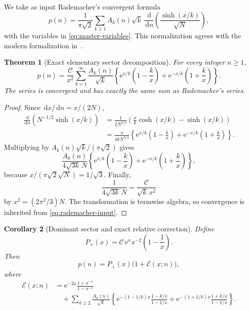 \documentclass[11pt,a4paper]{article}
\numberwithin{equation}{section}
\newtheorem{theorem}{Theorem}[section]
\newtheorem{corollary}[theorem]{Corollary}
\theoremstyle{remark}
\newcommand{\e}{\mathrm e}
\newcommand{\dd}{\,\mathrm d}
\newcommand{\Ccal}{\mathcal C}
\newcommand{\Ecal}{\mathcal E}
\begin{document}
We take as input Rademacher's convergent formula
\begin{equation}\label{eq:rademacher-input}
 p(n)=\frac1{\pi\sqrt2}\sum_{k\ge1}A_k(n)\sqrt{k}\,
 \frac{\dd}{\dd n}
 \left(\frac{\sinh(x/k)}{\sqrt N}\right),
\end{equation}
with the variables in \cref{eq:master-variables}.  This normalization agrees with the modern formalization in~\cite{EberlPaulson2026}.

\begin{theorem}[Exact elementary sector decomposition]\label{thm:exact-sector}
For every integer $n\ge1$,
\begin{equation}\label{eq:exact-sector}
 p(n)=\frac{\Ccal}{x^2}\sum_{k=1}^{\infty}\frac{A_k(n)}{\sqrt{k}}
 \left\{
 \e^{x/k}\left(1-\frac{k}{x}\right)
 +\e^{-x/k}\left(1+\frac{k}{x}\right)
 \right\}.
\end{equation}
The series is convergent and has exactly the same sum as Rademacher's series.
\end{theorem}

\begin{proof}
Since $\dd x/\dd n=x/(2N)$,
\begin{align}
 \frac{\dd}{\dd n}\left(N^{-1/2}\sinh(x/k)\right)
 &=\frac1{2N^{3/2}}
 \left(\frac{x}{k}\cosh(x/k)-\sinh(x/k)\right)\\
 &=\frac{x}{4kN^{3/2}}
 \left\{
 \e^{x/k}\left(1-\frac{k}{x}\right)
 +\e^{-x/k}\left(1+\frac{k}{x}\right)
 \right\}.
\end{align}
Multiplying by $A_k(n)\sqrt{k}/(\pi\sqrt2)$ gives
\[
 \frac{A_k(n)}{4\sqrt{3k}\,N}
 \left\{
 \e^{x/k}\left(1-\frac{k}{x}\right)
 +\e^{-x/k}\left(1+\frac{k}{x}\right)
 \right\},
\]
because $x/(\pi\sqrt2\sqrt N)=1/\sqrt3$.  Finally,
\[
 \frac1{4\sqrt{3k}\,N}=\frac{\Ccal}{\sqrt{k}\,x^2}
\]
by $x^2=(2\pi^2/3)N$.  The transformation is termwise algebra, so convergence is inherited from \cref{eq:rademacher-input}.
\end{proof}

\begin{corollary}[Dominant sector and exact relative correction]\label{cor:relative-correction}
Define
\begin{equation}\label{eq:Pplus}
 P_+(x)=\Ccal\,\e^x x^{-2}\left(1-\frac1x\right).
\end{equation}
Then
\begin{equation}\label{eq:p-relative}
 p(n)=P_+(x)\bigl(1+\Ecal(x;n)\bigr),
\end{equation}
where
\begin{align}
 \Ecal(x;n)
 &=\e^{-2x}\frac{1+x^{-1}}{1-x^{-1}}\label{eq:E-full}\\
 &\quad+\sum_{k\ge2}\frac{A_k(n)}{\sqrt{k}}
 \left\{
 \e^{-(1-1/k)x}\frac{1-k/x}{1-1/x}
 +\e^{-(1+1/k)x}\frac{1+k/x}{1-1/x}
 \right\}.
 \nonumber
\end{align}
\end{corollary}
\end{document}
